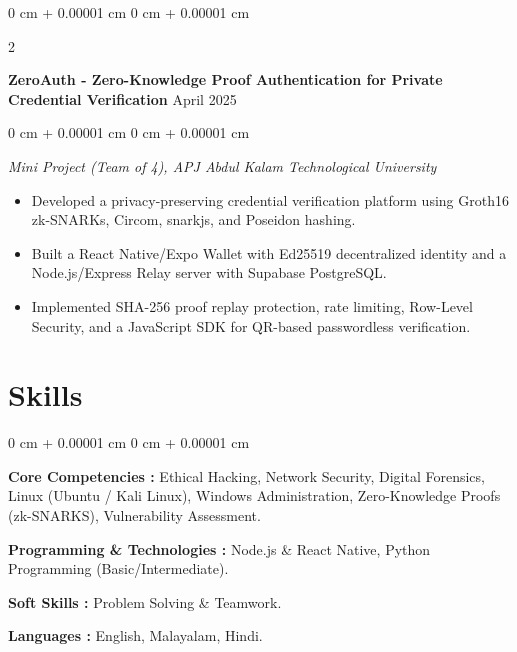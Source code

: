 \documentclass[10pt, a4paper]{article}
\newenvironment{highlights}{
    \begin{itemize}[
        topsep=0.10 cm,
        parsep=0.10 cm,
        partopsep=0pt,
        itemsep=0pt,
        leftmargin=0 cm + 10pt
    ]
}{
    \end{itemize}
} %
\newenvironment{onecolentry}{
    \begin{adjustwidth}{
        0 cm + 0.00001 cm
    }{
        0 cm + 0.00001 cm
    }
}{
    \end{adjustwidth}
} %
\newenvironment{twocolentry}[2][]{
    \onecolentry
    \def\secondColumn{#2}
    \setcolumnwidth{\fill, 4.5 cm}
    \begin{paracol}{2}
}{
    \switchcolumn \raggedleft \secondColumn
    \end{paracol}
    \endonecolentry
} %
\begin{document}
        \vspace{0.10 cm}

            \begin{twocolentry}{
            April 2025
        }
            \textbf{ZeroAuth - Zero-Knowledge Proof Authentication for Private Credential Verification}\end{twocolentry}

        \vspace{0.01 cm}
        
        \begin{onecolentry}
            \textit{Mini Project (Team of 4), APJ Abdul Kalam Technological University}
        \end{onecolentry}

        \vspace{0.01 cm}
        
            \begin{highlights}
                \item Developed a privacy-preserving credential verification platform using Groth16 zk-SNARKs, Circom, snarkjs, and Poseidon hashing.
                \item Built a React Native/Expo Wallet with Ed25519 decentralized identity and a Node.js/Express Relay server with Supabase PostgreSQL.
                \item Implemented SHA-256 proof replay protection, rate limiting, Row-Level Security, and a JavaScript SDK for QR-based passwordless verification.
            \end{highlights}

    \section{Skills}

    \begin{onecolentry}
        
        \textbf{Core Competencies :} Ethical Hacking, Network Security, Digital Forensics, Linux (Ubuntu / Kali Linux), Windows Administration, Zero-Knowledge Proofs (zk-SNARKS), Vulnerability Assessment.

        \vspace{0.1 cm}

        \textbf{Programming \& Technologies :} Node.js \& React Native, Python Programming (Basic/Intermediate).

        \vspace{0.1 cm}

        \textbf{Soft Skills :} Problem Solving \& Teamwork.
        
        \vspace{0.1 cm}
        
        \textbf{Languages :} English, Malayalam, Hindi.
        
    \end{onecolentry}
\end{document}
